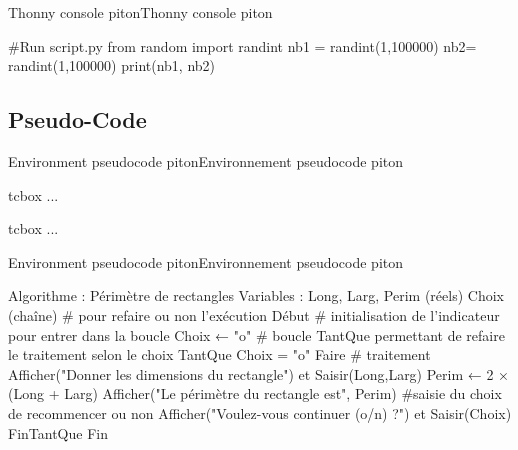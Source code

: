 \documentclass[a4paper,english,11pt]{article}
\begin{document}
\begin{myprestex}{Thonny console piton}{Thonny console piton}
\begin{pflpitonthonnyconsole}[consolename={python 3.8.10},width=12cm]{}
#Run script.py
from random import randint
nb1 = randint(1,100000)
nb2= randint(1,100000)
print(nb1, nb2)
\end{pflpitonthonnyconsole}
\end{myprestex}

\subsection{Pseudo-Code}

\begin{myprestexcode}{Environment pseudocode piton}{Environnement pseudocode piton}
\begin{pflpseudocodepiton}[<keys>]{tcbox} ... \end{pflpseudocodepiton}
\begin{PseudoCodePiton}[<clés>]{tcbox}    ... \end{PseudoCodePiton}

\end{myprestexcode}

\begin{myprestex}{Environment pseudocode piton}{Environnement pseudocode piton}
\begin{PseudoCodePiton}[Lignes=false,Filigrane=false,Couleurs=true]{}
Algorithme : Périmètre de rectangles
Variables  : Long, Larg, Perim (réels)
             Choix (chaîne) # pour refaire ou non l'exécution
Début
	# initialisation de l'indicateur pour entrer dans la boucle
	Choix ← "o"
	# boucle TantQue permettant de refaire le traitement selon le choix
	TantQue Choix = "o" Faire
		# traitement
		Afficher("Donner les dimensions du rectangle") et Saisir(Long,Larg)
		Perim ← 2 × (Long + Larg)
		Afficher("Le périmètre du rectangle est", Perim)
		#saisie du choix de recommencer ou non
	Afficher("Voulez-vous continuer (o/n) ?") et Saisir(Choix)
	FinTantQue
Fin
\end{PseudoCodePiton}
\end{myprestex}
\end{document}
